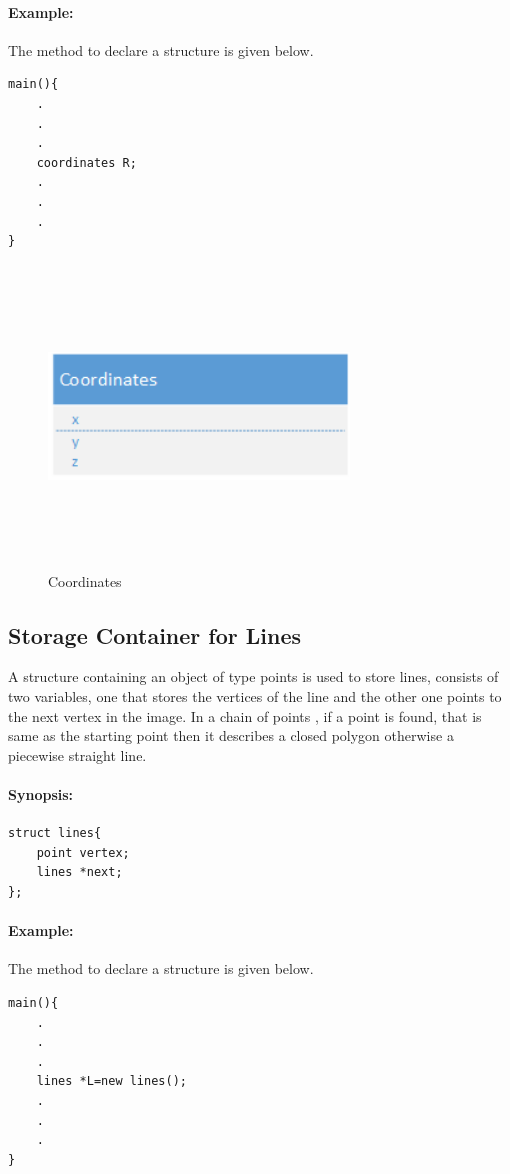 \paragraph{Example:}
The method to declare a structure is given below.
\begin{lstlisting}
main(){ 
    .
    .
    .
    coordinates R;
    .
    .
    .
} 
\end{lstlisting}
\begin{figure}[ht]
    \centering
    \includegraphics[width=8cm,height=8cm,keepaspectratio]{Pictures/Coordinatesxyz}
    \caption{Coordinates}
    \label{fig:XYZ}
\end{figure}
\subsection{Storage Container for Lines}
A structure containing an object of type points is used to store lines, consists of two variables, one that stores the vertices of the line and the other one points to the next vertex in the image. In a chain of points , if a point is found, that is same as the starting point then it describes a closed polygon otherwise a piecewise straight line. 
\pagebreak
\paragraph{Synopsis:}
\begin{lstlisting}
struct lines{
    point vertex;
    lines *next;
};
\end{lstlisting}
\paragraph{Example:}
The method to declare a structure is given below.
\begin{lstlisting}
main(){ 
    .
    .
    .
    lines *L=new lines();
    .
    .
    .
}
\end{lstlisting}
